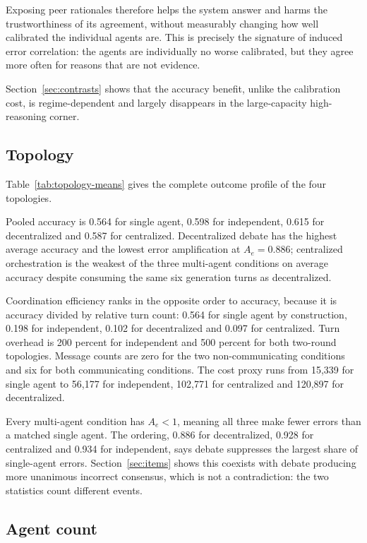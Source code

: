 Exposing peer rationales therefore helps the system answer and harms the trustworthiness
of its agreement, without measurably changing how well calibrated the individual agents
are. This is precisely the signature of induced error correlation: the agents are
individually no worse calibrated, but they agree more often for reasons that are not
evidence.

Section~\ref{sec:contrasts} shows that the accuracy benefit, unlike the calibration cost,
is regime-dependent and largely disappears in the large-capacity high-reasoning corner.

\subsection{Topology}

Table~\ref{tab:topology-means} gives the complete outcome profile of the four topologies.


Pooled accuracy is 0.564 for single agent, 0.598 for independent, 0.615 for decentralized
and 0.587 for centralized. Decentralized debate has the highest average accuracy and the
lowest error amplification at $A_e = 0.886$; centralized orchestration is the weakest of
the three multi-agent conditions on average accuracy despite consuming the same six
generation turns as decentralized.

Coordination efficiency ranks in the opposite order to accuracy, because it is accuracy
divided by relative turn count: 0.564 for single agent by construction, 0.198 for
independent, 0.102 for decentralized and 0.097 for centralized. Turn overhead is 200
percent for independent and 500 percent for both two-round topologies. Message counts are
zero for the two non-communicating conditions and six for both communicating conditions.
The cost proxy runs from 15{,}339 for single agent to 56{,}177 for independent, 102{,}771
for centralized and 120{,}897 for decentralized.

Every multi-agent condition has $A_e < 1$, meaning all three make fewer errors than a
matched single agent. The ordering, 0.886 for decentralized, 0.928 for centralized and
0.934 for independent, says debate suppresses the largest share of single-agent errors.
Section~\ref{sec:items} shows this coexists with debate producing more unanimous incorrect
consensus, which is not a contradiction: the two statistics count different events.

\subsection{Agent count}

